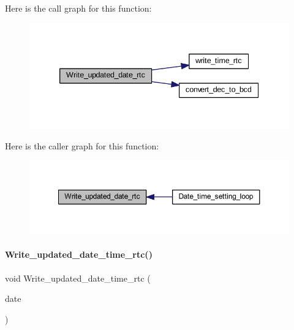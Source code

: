 Here is the call graph for this function\+:
\nopagebreak
\begin{figure}[H]
\begin{center}
\leavevmode
\includegraphics[width=339pt]{a00014_a7ae143903216d08d3f0c07b95e21c21b_cgraph}
\end{center}
\end{figure}
Here is the caller graph for this function\+:
\nopagebreak
\begin{figure}[H]
\begin{center}
\leavevmode
\includegraphics[width=350pt]{a00014_a7ae143903216d08d3f0c07b95e21c21b_icgraph}
\end{center}
\end{figure}
\mbox{\label{a00014_ad20fe32d70b509ba8f7f24a572e34f3f}} 
\paragraph{Write\+\_\+updated\+\_\+date\+\_\+time\+\_\+rtc()}
{\footnotesize\ttfamily void Write\+\_\+updated\+\_\+date\+\_\+time\+\_\+rtc (\begin{DoxyParamCaption}\item[{\textbf{ Date\+Time} $\ast$}]{date }\end{DoxyParamCaption})}

